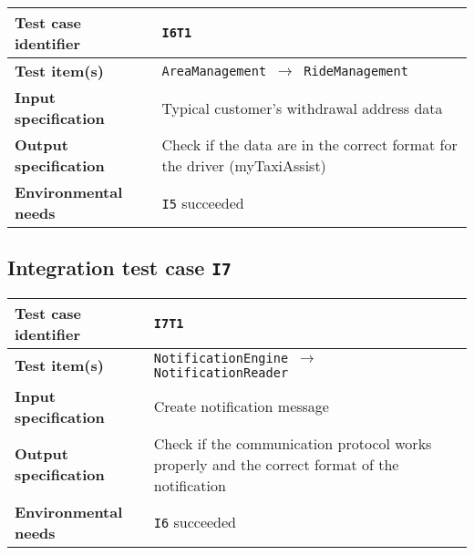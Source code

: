 \begin{table*}[!h]\centering\begin{tabularx}{.9\textwidth}{ >{\bfseries}l X }\toprule%
Test case identifier	&	\texttt{I6T1}	\\\midrule
Test item(s)		&	\texttt{AreaManagement $\to$ RideManagement}	\\\midrule
Input specification	&	Typical customer's withdrawal address data	\\\midrule
Output specification	&	Check if the data are in the correct format for the driver (myTaxiAssist)	\\\midrule
Environmental needs	&	\texttt{I5} succeeded	\\
\bottomrule\end{tabularx}\end{table*}





\clearpage



\subsection*{Integration test case \normalfont\texttt{I7}}\label{subsec:t7}

\begin{table*}[!h]\centering\begin{tabularx}{.9\textwidth}{ >{\bfseries}l X }\toprule%
Test case identifier	&	\texttt{I7T1}	\\\midrule
Test item(s)		&	\texttt{NotificationEngine $\to$ NotificationReader}	\\\midrule
Input specification	&	Create notification message	\\\midrule
Output specification	&	Check if the communication protocol works properly and the correct format of the notification	\\\midrule
Environmental needs	&	\texttt{I6} succeeded	\\
\bottomrule\end{tabularx}\end{table*}




